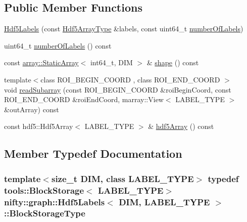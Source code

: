 \subsection*{Public Member Functions}
\begin{DoxyCompactItemize}
\item 
\hyperlink{classnifty_1_1graph_1_1Hdf5Labels_aeaa1ed4dc0066a4c0ee0d176a55c3dd3}{Hdf5\+Labels} (const \hyperlink{classnifty_1_1graph_1_1Hdf5Labels_a2cfeca010fa78ee8fdfa1767ae0fbe4a}{Hdf5\+Array\+Type} \&labels, const uint64\+\_\+t \hyperlink{classnifty_1_1graph_1_1Hdf5Labels_ad4161df4c665904650b8db47c11bf0b9}{number\+Of\+Labels})
\item 
uint64\+\_\+t \hyperlink{classnifty_1_1graph_1_1Hdf5Labels_ad4161df4c665904650b8db47c11bf0b9}{number\+Of\+Labels} () const 
\item 
const \hyperlink{namespacenifty_1_1array_a683f151f19c851754e0c6d55ed16a0c2}{array\+::\+Static\+Array}$<$ int64\+\_\+t, D\+I\+M $>$ \& \hyperlink{classnifty_1_1graph_1_1Hdf5Labels_a11341fbb53d6b96ac4b88ebf24a34629}{shape} () const 
\item 
{\footnotesize template$<$class R\+O\+I\+\_\+\+B\+E\+G\+I\+N\+\_\+\+C\+O\+O\+R\+D , class R\+O\+I\+\_\+\+E\+N\+D\+\_\+\+C\+O\+O\+R\+D $>$ }\\void \hyperlink{classnifty_1_1graph_1_1Hdf5Labels_ae540ccb62e91c55c9e9a163418795956}{read\+Subarray} (const R\+O\+I\+\_\+\+B\+E\+G\+I\+N\+\_\+\+C\+O\+O\+R\+D \&roi\+Begin\+Coord, const R\+O\+I\+\_\+\+E\+N\+D\+\_\+\+C\+O\+O\+R\+D \&roi\+End\+Coord, marray\+::\+View$<$ L\+A\+B\+E\+L\+\_\+\+T\+Y\+P\+E $>$ \&out\+Array) const 
\item 
const hdf5\+::\+Hdf5\+Array$<$ L\+A\+B\+E\+L\+\_\+\+T\+Y\+P\+E $>$ \& \hyperlink{classnifty_1_1graph_1_1Hdf5Labels_a1423d8d5bcadf2251c54260d64fafcd6}{hdf5\+Array} () const 
\end{DoxyCompactItemize}


\subsection{Member Typedef Documentation}
\hypertarget{classnifty_1_1graph_1_1Hdf5Labels_abfffba953f16947d3907634b3aabdcad}{}
\subsubsection[{Block\+Storage\+Type}]{\setlength{\rightskip}{0pt plus 5cm}template$<$size\+\_\+t D\+I\+M, class L\+A\+B\+E\+L\+\_\+\+T\+Y\+P\+E$>$ typedef {\bf tools\+::\+Block\+Storage}$<$ L\+A\+B\+E\+L\+\_\+\+T\+Y\+P\+E$>$ {\bf nifty\+::graph\+::\+Hdf5\+Labels}$<$ D\+I\+M, L\+A\+B\+E\+L\+\_\+\+T\+Y\+P\+E $>$\+::{\bf Block\+Storage\+Type}}\label{classnifty_1_1graph_1_1Hdf5Labels_abfffba953f16947d3907634b3aabdcad}
\hypertarget{classnifty_1_1graph_1_1Hdf5Labels_a2cfeca010fa78ee8fdfa1767ae0fbe4a}{}
